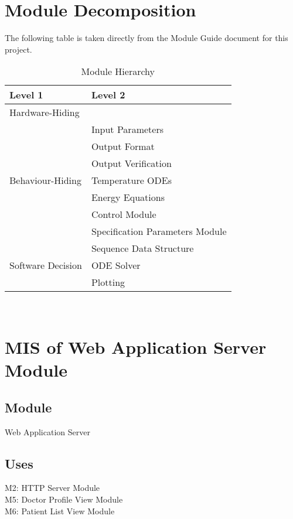 \documentclass[12pt, titlepage]{article}
\begin{document}
\section{Module Decomposition}

The following table is taken directly from the Module Guide document for this project.

\begin{table}[h!]
\centering
\begin{tabular}{p{} p{}}
\toprule
\textbf{Level 1} & \textbf{Level 2}\\
\midrule

{Hardware-Hiding} & ~ \\
\midrule

\multirow{7}{0.3\textwidth}{Behaviour-Hiding} & Input Parameters\\
& Output Format\\
& Output Verification\\
& Temperature ODEs\\
& Energy Equations\\ 
& Control Module\\
& Specification Parameters Module\\
\midrule

\multirow{3}{0.3\textwidth}{Software Decision} & {Sequence Data Structure}\\
& ODE Solver\\
& Plotting\\
\bottomrule

\end{tabular}
\caption{Module Hierarchy}
\label{TblMH}
\end{table}

\newpage
~\newpage

\section{MIS of Web Application Server Module} 

\subsection{Module}
Web Application Server   
\subsection{Uses}
M2: HTTP Server Module \\ 
M5: Doctor Profile View Module \\ 
M6: Patient List View Module \\ 
\end{document}
